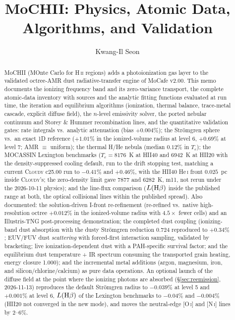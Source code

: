 \documentclass[english,a4paper]{my_memo}
\begin{document}
\title{MoCHII: Physics, Atomic Data, Algorithms, and Validation}
\author{Kwang-Il Seon}
\date{\docmoddate}
\maketitle

\begin{abstract}
MoCHII (MOnte Carlo for H\,\textsc{ii} regions) adds a photoionization gas
layer to the validated octree-AMR dust radiative-transfer engine of MoCafe
v2.00.  This memo documents the
ionizing frequency band and its zero-variance transport, the complete
atomic-data inventory with sources and the analytic fitting functions
evaluated at run time, the iteration and equilibrium algorithms
(ionization, thermal balance, trace-metal cascade, explicit diffuse
field), the $n$-level emissivity solver, the ported nebular
continuum and Storey \& Hummer recombination lines, and the
quantitative validation gates: rate
integrals vs.\ analytic attenuation (bias $+0.004\%$); the Str\"omgren
sphere vs.\ an exact 1D reference ($+1.01\%$ in the ionized-volume radius at level 6, $+0.69\%$ at level 7; AMR
$\equiv$ uniform); the thermal H/He nebula (median $0.12\%$ in $T_e$);
the MOCASSIN Lexington benchmarks ($T_e = 8176$~K at HII40 and 6942~K at
HII20 with the density-suppressed cooling default, run to the drift stopping
test, matching a current \textsc{Cloudy} c25.00 run to $-0.41\%$ and $+0.46\%$,
with the HII40 He\,\textsc{i} front $0.025$~pc inside \textsc{Cloudy}'s; the
zero-density limit gave 7877 and 6282~K, m11, not rerun under the
2026-10-11 physics); and the line-flux comparison
($L({\rm H}\beta)$ inside the published range at both, the optical
collisional lines within the published spread).
Also documented: the solution-driven I-front re-refinement
(re-refined vs.\ native high-resolution octree $+0.012\%$ in the
ionized-volume radius with $4.5\times$ fewer cells) and an Illustris-TNG
post-processing demonstration; the completed dust coupling
(ionizing-band dust absorption with the dusty Str\"omgren reduction
0.724 reproduced to $+0.34\%$; EUV/FUV dust \emph{scattering} with
forced-first interaction sampling, validated by bracketing; live
ionization-dependent dust with a PAH-specific survival factor; and the
equilibrium dust temperature + IR spectrum consuming the transported
grain heating, energy closure 1.000); and the incremental metal
additions (argon, magnesium, iron, and silicon/chlorine/calcium) as
pure data operations.  An optional launch of the diffuse field at the
point where the ionizing photons are absorbed (\S\ref{sec:reemission},
2026-11-13) reproduces the default Str\"omgren radius to $-0.039\%$ at level 5
and $+0.001\%$ at level 6, $L({\rm H}\beta)$ of the Lexington benchmarks to
$-0.04\%$ and $-0.004\%$ (HII20 not converged in the new mode), and moves the neutral-edge [O\,\textsc{i}] and
[N\,\textsc{i}] lines by 2--6\%.
\end{abstract}
\end{document}
